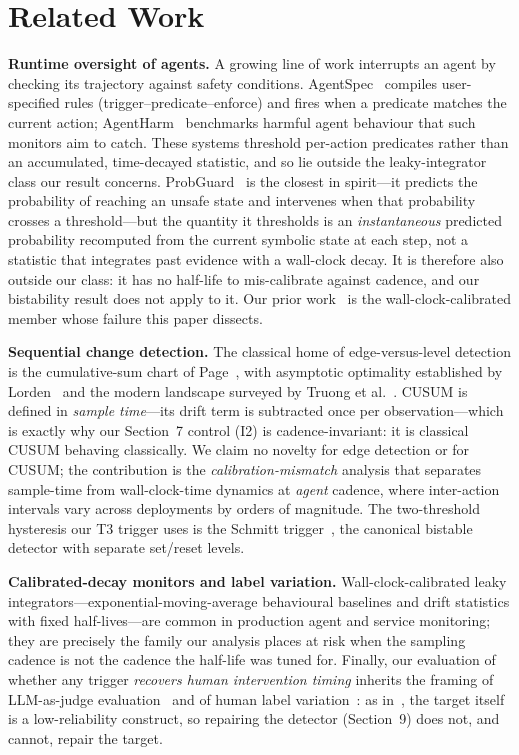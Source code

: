 \section{Related Work}
\label{sec:related}

\textbf{Runtime oversight of agents.}
A growing line of work interrupts an agent by checking its trajectory against
safety conditions. AgentSpec~\cite{agentspec} compiles user-specified rules
(trigger--predicate--enforce) and fires when a predicate matches the current
action; AgentHarm~\cite{agentharm} benchmarks harmful agent behaviour that such
monitors aim to catch. These systems threshold per-action predicates rather
than an accumulated, time-decayed statistic, and so lie outside the
leaky-integrator class our result concerns. ProbGuard~\cite{probguard} is the
closest in spirit---it predicts the probability of reaching an unsafe state and
intervenes when that probability crosses a threshold---but the quantity it
thresholds is an \emph{instantaneous} predicted probability recomputed from the
current symbolic state at each step, not a statistic that integrates past
evidence with a wall-clock decay. It is therefore also outside our class: it
has no half-life to mis-calibrate against cadence, and our bistability result
does not apply to it. Our prior work~\cite{P1} is the wall-clock-calibrated
member whose failure this paper dissects.

\textbf{Sequential change detection.}
The classical home of edge-versus-level detection is the cumulative-sum chart
of Page~\cite{page1954}, with asymptotic optimality established by
Lorden~\cite{lorden1971} and the modern landscape surveyed by Truong et
al.~\cite{truong2020}. CUSUM is defined in \emph{sample time}---its drift term
is subtracted once per observation---which is exactly why our Section~7 control
(I2) is cadence-invariant: it is classical CUSUM behaving classically. We claim
no novelty for edge detection or for CUSUM; the contribution is the
\emph{calibration-mismatch} analysis that separates sample-time from
wall-clock-time dynamics at \emph{agent} cadence, where inter-action intervals
vary across deployments by orders of magnitude. The two-threshold hysteresis
our T3 trigger uses is the Schmitt trigger~\cite{schmitt1938}, the canonical
bistable detector with separate set/reset levels.

\textbf{Calibrated-decay monitors and label variation.}
Wall-clock-calibrated leaky integrators---exponential-moving-average behavioural
baselines and drift statistics with fixed half-lives---are common in production
agent and service monitoring; they are precisely the family our analysis places
at risk when the sampling cadence is not the cadence the half-life was tuned
for. Finally, our evaluation of whether any trigger \emph{recovers human
intervention timing} inherits the framing of LLM-as-judge
evaluation~\cite{zheng2023} and of human label
variation~\cite{plank2022,krippendorff2004}: as in~\cite{P1}, the target itself
is a low-reliability construct, so repairing the detector (Section~9) does not,
and cannot, repair the target.
